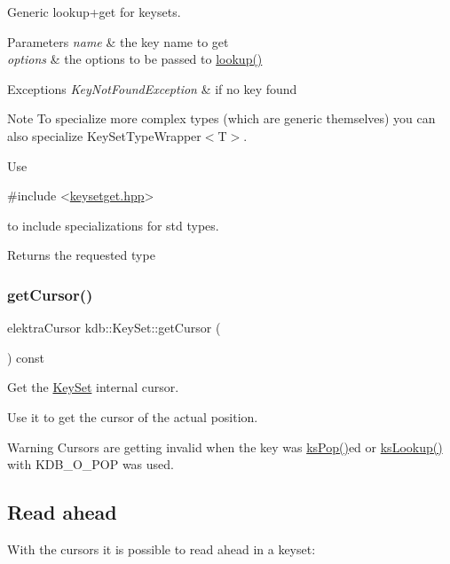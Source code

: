 Generic lookup+get for keysets. 


\begin{DoxyParams}{Parameters}
{\em name} & the key name to get \\
\hline
{\em options} & the options to be passed to \hyperlink{classkdb_1_1KeySet_a2b8537e388edfbb6941d771106c0ae3a}{lookup()}\\
\hline
\end{DoxyParams}

\begin{DoxyExceptions}{Exceptions}
{\em Key\+Not\+Found\+Exception} & if no key found\\
\hline
\end{DoxyExceptions}
\begin{DoxyNote}{Note}
To specialize more complex types (which are generic themselves) you can also specialize Key\+Set\+Type\+Wrapper$<$\+T$>$.
\end{DoxyNote}
Use 
\begin{DoxyCode}
\textcolor{preprocessor}{#include <\hyperlink{keysetget_8hpp}{keysetget.hpp}>}
\end{DoxyCode}
 to include specializations for std types.

\begin{DoxyReturn}{Returns}
the requested type 
\end{DoxyReturn}
\mbox{\label{classkdb_1_1KeySet_accc11bcf2a4b5937ce9f0787c011c2d9}} 
\subsubsection{\texorpdfstring{get\+Cursor()}{getCursor()}}
{\footnotesize\ttfamily elektra\+Cursor kdb\+::\+Key\+Set\+::get\+Cursor (\begin{DoxyParamCaption}{ }\end{DoxyParamCaption}) const\hspace{0.3cm}{\ttfamily [inline]}}



Get the \hyperlink{classkdb_1_1KeySet}{Key\+Set} internal cursor. 

Use it to get the cursor of the actual position.

\begin{DoxyWarning}{Warning}
Cursors are getting invalid when the key was \hyperlink{group__keyset_gae42530b04defb772059de0600159cf69}{ks\+Pop()}ed or \hyperlink{group__keyset_ga60f1ddcf23272f2b29b90e92ebe9b56f}{ks\+Lookup()} with K\+D\+B\+\_\+\+O\+\_\+\+P\+OP was used.
\end{DoxyWarning}
\hypertarget{group__keyset_readahead}{}\subsection{Read ahead}\label{group__keyset_readahead}
With the cursors it is possible to read ahead in a keyset\+:



